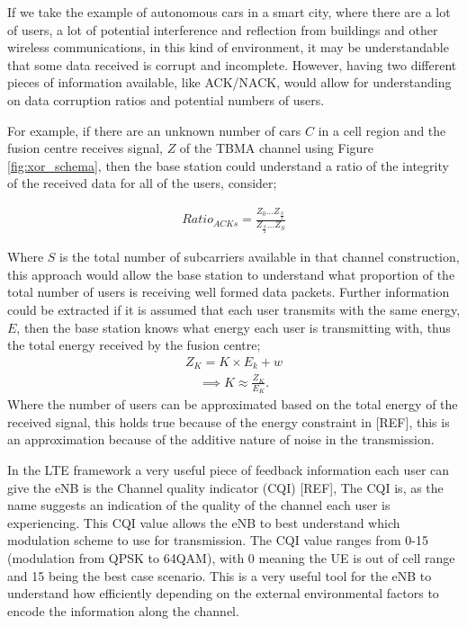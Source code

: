 \documentclass{article}
\begin{document}
If we take the example of autonomous cars in a smart city, where there are a lot of users, a lot of potential interference and reflection from buildings and other wireless communications, in this kind of environment, it may be understandable that some data received is corrupt and incomplete. However, having two different pieces of information available, like ACK/NACK, would allow for understanding on data corruption ratios and potential numbers of users. 

For example, if there are an unknown number of cars $C$ in a cell region and the fusion centre receives signal, $Z$ of the TBMA channel using Figure \ref{fig:xor_schema}, then the base station could understand a ratio of the integrity of the received data for all of the users, consider;

\begin{align}
    Ratio_{ACKs} = \frac{Z_{0}\ldots Z_{\frac{S}{2}}}{Z_{\frac{S}{2}}\ldots Z_{S}}
\end{align}

Where $S$ is the total number of subcarriers available in that channel construction, this approach would allow the base station to understand what proportion of the total number of users is receiving well formed data packets. Further information could be extracted if it is assumed that each user transmits with the same energy, $E$, then the base station knows what energy each user is transmitting with, thus the total energy received by the fusion centre;
\begin{align}
    Z_{K}  = K \times E_{k} + w
\end{align}
\begin{align}
    \implies K \approx \frac{Z_{K}}{E_{K}}.
\end{align}
Where the number of users can be approximated based on the total energy of the received signal, this holds true because of the energy constraint in [REF], this is an approximation because of the additive nature of noise in the transmission. 

In the LTE framework a very useful piece of feedback information each user can give the eNB is the Channel quality indicator (CQI) [REF], The CQI is, as the name suggests an indication of the quality of the channel each user is experiencing. This CQI value allows the eNB to best understand which modulation scheme to use for transmission. The CQI value ranges from 0-15 (modulation from QPSK to 64QAM), with 0 meaning the UE is out of cell range and 15 being the best case scenario. This is a very useful tool for the eNB to understand how efficiently depending on the external environmental factors to encode the information along the channel. 
\end{document}

